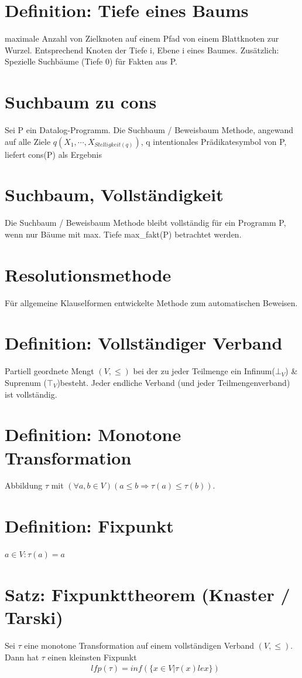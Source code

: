 \documentclass[12pt, a4paper]{article}
\begin{document}
\section*{Definition: Tiefe eines Baums}
maximale Anzahl von Zielknoten auf einem Pfad von einem Blattknoten zur Wurzel. Entsprechend Knoten der Tiefe i, Ebene i eines Baumes. Zusätzlich: Spezielle Suchbäume (Tiefe 0) für Fakten aus P.

\section*{Suchbaum zu cons}
Sei P ein Datalog-Programm. Die Suchbaum  / Beweisbaum Methode, angewand auf alle Ziele $q(X_1, \cdots, X_{Stelligkeit(q)})$, q intentionales Prädikatesymbol von P, liefert cons(P) als Ergebnis

\section*{Suchbaum, Vollständigkeit}
Die Suchbaum / Beweisbaum Methode bleibt vollständig für ein Programm P, wenn nur Bäume mit max. Tiefe max\_fakt(P) betrachtet werden.

\section*{Resolutionsmethode}
Für allgemeine Klauselformen entwickelte Methode zum automatischen Beweisen.


\section*{Definition: Vollständiger Verband}
Partiell geordnete Mengt $(V, \le)$ bei der zu jeder Teilmenge ein Infinum($\bot_V$) \& Suprenum ($\top_V$)besteht.
Jeder endliche Verband (und jeder Teilmengenverband) ist vollständig.

\section*{Definition: Monotone Transformation}
Abbildung $\tau$ mit $(\forall a,b \in V) (a \le b \Rightarrow \tau(a) \le \tau(b))$.
 
\section*{Definition: Fixpunkt}
$a \in V: \tau(a) = a$

\section*{Satz: Fixpunkttheorem (Knaster / Tarski)}
Sei $\tau$ eine monotone Transformation auf einem vollständigen Verband $(V, \le)$. Dann hat $\tau$ einen kleinsten Fixpunkt 
\begin{align*}
&lfp(\tau) = inf(\{ x \in V | \tau(x) le x \})
\end{align*}
\end{document}
